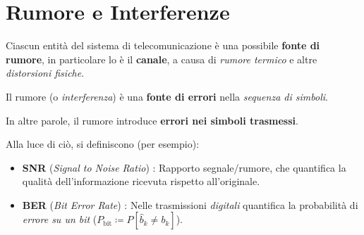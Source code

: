 
\section{Rumore e Interferenze}

Ciascun entità del sistema di telecomunicazione è una possibile \textbf{fonte di rumore},
in particolare lo è il \textbf{canale}, a causa di \textit{rumore termico} e altre
\textit{distorsioni fisiche}.

\begin{definition}[RUMORE]
    Il rumore (o \textit{interferenza}) è una \textbf{fonte di errori}
    nella \textit{sequenza di simboli}.
\end{definition}

In altre parole, il rumore introduce \textbf{errori nei simboli trasmessi}.

Alla luce di ciò, si definiscono (per esempio):
\begin{itemize}
    \item \textbf{SNR} (\textit{Signal to Noise Ratio}) : Rapporto segnale/rumore, che quantifica
        la qualità dell'informazione ricevuta rispetto all'originale.
    \item \textbf{BER} (\textit{Bit Error Rate}) : Nelle trasmissioni \textit{digitali} quantifica
        la probabilità di \textit{errore su un bit} ($P_{\text{bit}}\coloneqq P[\hat{b}_k \ne b_k]$).
\end{itemize}
